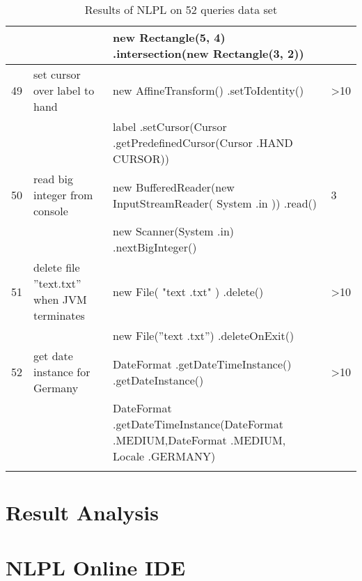 \begin{longtable}{|p{}|p{}|p{}|p{}|}
		\rowcolor[HTML]{9AFF99} 
		&                                                        & new Rectangle(5, 4) .intersection(new Rectangle(3, 2))                                                           &                                         \\ \hline
		\rowcolor[HTML]{FFCCC9} 
		49                                & set cursor over label to hand                          & new AffineTransform() .setToIdentity()                                                                           & \textgreater{}10                        \\ \hline
		\rowcolor[HTML]{9AFF99} 
		&                                                        & label .setCursor(Cursor .getPredefinedCursor(Cursor .HAND CURSOR))                                               &                                         \\ \hline
		\rowcolor[HTML]{FFCCC9} 
		50                                & read big integer from console                          & new BufferedReader(new InputStreamReader( System .in )) .read()                                                  & 3                                       \\ \hline
		\rowcolor[HTML]{9AFF99} 
		&                                                        & new Scanner(System .in) .nextBigInteger()                                                                        &                                         \\ \hline
		\rowcolor[HTML]{FFCCC9} 
		51                                & delete file ”text.txt” when JVM terminates             & new File( "text .txt" )  .delete()                                                                               & \textgreater{}10                        \\ \hline
		\rowcolor[HTML]{9AFF99} 
		&                                                        & new File(”text .txt”) .deleteOnExit()                                                                            &                                         \\ \hline
		\rowcolor[HTML]{FFCCC9} 
		52                                & get date instance for Germany                          & DateFormat .getDateTimeInstance() .getDateInstance()                                                             & \textgreater{}10                        \\ \hline
		\rowcolor[HTML]{9AFF99} 
		&                                                        & DateFormat .getDateTimeInstance(DateFormat .MEDIUM,DateFormat .MEDIUM, Locale .GERMANY)                          &                                         \\ \hline
		 \caption[Results of NLPL on 52 queries data set]{Results of NLPL on 52 queries data set}
		\label{table:TotalResultOnAnyCode} 
\end{longtable}

\section{Result Analysis}

\section{NLPL Online IDE}



